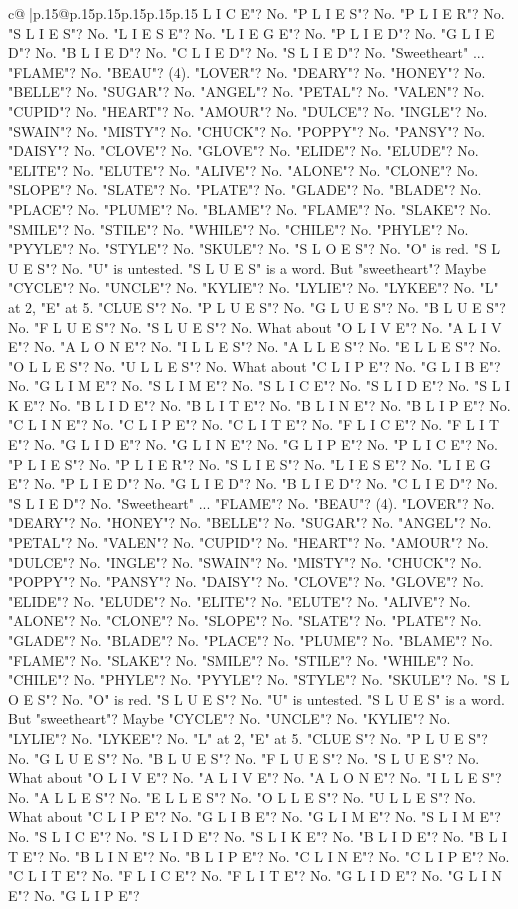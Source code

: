 \documentclass{article}
\begin{document}
{\begin{supertabular}{c@{$\;$}|p{.15\linewidth}@{}p{.15\linewidth}p{.15\linewidth}p{.15\linewidth}p{.15\linewidth}p{.15\linewidth}}
{{{L I C E"? No. "P L I E S"? No. "P L I E R"? No. "S L I E S"? No. "L I E S E"? No. "L I E G E"? No. "P L I E D"? No. "G L I E D"? No. "B L I E D"? No. "C L I E D"? No. "S L I E D"? No. "Sweetheart" ... "FLAME"? No. "BEAU"? (4). "LOVER"? No. "DEARY"? No. "HONEY"? No. "BELLE"? No. "SUGAR"? No. "ANGEL"? No. "PETAL"? No. "VALEN"? No. "CUPID"? No. "HEART"? No. "AMOUR"? No. "DULCE"? No. "INGLE"? No. "SWAIN"? No. "MISTY"? No. "CHUCK"? No. "POPPY"? No. "PANSY"? No. "DAISY"? No. "CLOVE"? No. "GLOVE"? No. "ELIDE"? No. "ELUDE"? No. "ELITE"? No. "ELUTE"? No. "ALIVE"? No. "ALONE"? No. "CLONE"? No. "SLOPE"? No. "SLATE"? No. "PLATE"? No. "GLADE"? No. "BLADE"? No. "PLACE"? No. "PLUME"? No. "BLAME"? No. "FLAME"? No. "SLAKE"? No. "SMILE"? No. "STILE"? No. "WHILE"? No. "CHILE"? No. "PHYLE"? No. "PYYLE"? No. "STYLE"? No. "SKULE"? No. "S L O E S"? No. "O" is red. "S L U E S"? No. "U" is untested. "S L U E S" is a word. But "sweetheart"? Maybe "CYCLE"? No. "UNCLE"? No. "KYLIE"? No. "LYLIE"? No. "LYKEE"? No. "L" at 2, "E" at 5. "CLUE S"? No. "P L U E S"? No. "G L U E S"? No. "B L U E S"? No. "F L U E S"? No. "S L U E S"? No. What about "O L I V E"? No. "A L I V E"? No. "A L O N E"? No. "I L L E S"? No. "A L L E S"? No. "E L L E S"? No. "O L L E S"? No. "U L L E S"? No. What about "C L I P E"? No. "G L I B E"? No. "G L I M E"? No. "S L I M E"? No. "S L I C E"? No. "S L I D E"? No. "S L I K E"? No. "B L I D E"? No. "B L I T E"? No. "B L I N E"? No. "B L I P E"? No. "C L I N E"? No. "C L I P E"? No. "C L I T E"? No. "F L I C E"? No. "F L I T E"? No. "G L I D E"? No. "G L I N E"? No. "G L I P E"? No. "P L I C E"? No. "P L I E S"? No. "P L I E R"? No. "S L I E S"? No. "L I E S E"? No. "L I E G E"? No. "P L I E D"? No. "G L I E D"? No. "B L I E D"? No. "C L I E D"? No. "S L I E D"? No. "Sweetheart" ... "FLAME"? No. "BEAU"? (4). "LOVER"? No. "DEARY"? No. "HONEY"? No. "BELLE"? No. "SUGAR"? No. "ANGEL"? No. "PETAL"? No. "VALEN"? No. "CUPID"? No. "HEART"? No. "AMOUR"? No. "DULCE"? No. "INGLE"? No. "SWAIN"? No. "MISTY"? No. "CHUCK"? No. "POPPY"? No. "PANSY"? No. "DAISY"? No. "CLOVE"? No. "GLOVE"? No. "ELIDE"? No. "ELUDE"? No. "ELITE"? No. "ELUTE"? No. "ALIVE"? No. "ALONE"? No. "CLONE"? No. "SLOPE"? No. "SLATE"? No. "PLATE"? No. "GLADE"? No. "BLADE"? No. "PLACE"? No. "PLUME"? No. "BLAME"? No. "FLAME"? No. "SLAKE"? No. "SMILE"? No. "STILE"? No. "WHILE"? No. "CHILE"? No. "PHYLE"? No. "PYYLE"? No. "STYLE"? No. "SKULE"? No. "S L O E S"? No. "O" is red. "S L U E S"? No. "U" is untested. "S L U E S" is a word. But "sweetheart"? Maybe "CYCLE"? No. "UNCLE"? No. "KYLIE"? No. "LYLIE"? No. "LYKEE"? No. "L" at 2, "E" at 5. "CLUE S"? No. "P L U E S"? No. "G L U E S"? No. "B L U E S"? No. "F L U E S"? No. "S L U E S"? No. What about "O L I V E"? No. "A L I V E"? No. "A L O N E"? No. "I L L E S"? No. "A L L E S"? No. "E L L E S"? No. "O L L E S"? No. "U L L E S"? No. What about "C L I P E"? No. "G L I B E"? No. "G L I M E"? No. "S L I M E"? No. "S L I C E"? No. "S L I D E"? No. "S L I K E"? No. "B L I D E"? No. "B L I T E"? No. "B L I N E"? No. "B L I P E"? No. "C L I N E"? No. "C L I P E"? No. "C L I T E"? No. "F L I C E"? No. "F L I T E"? No. "G L I D E"? No. "G L I N E"? No. "G L I P E"? }}}
\end{supertabular}}
\end{document}
